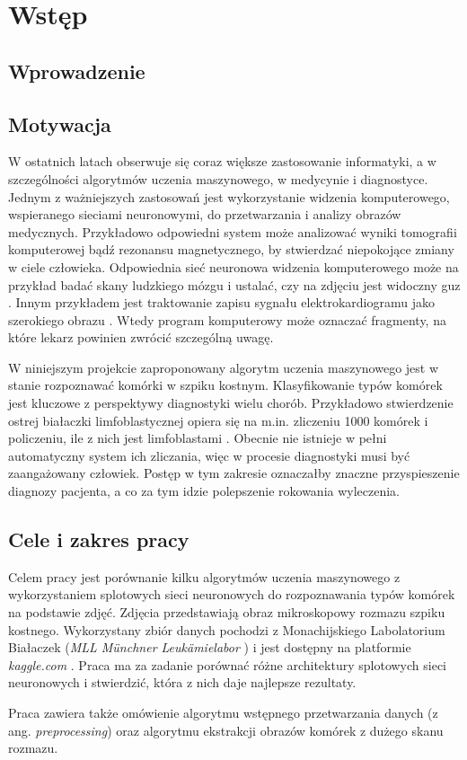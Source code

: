 \chapter{Wstęp}

\section{Wprowadzenie}


\section{Motywacja}

W ostatnich latach obserwuje się coraz większe zastosowanie informatyki, a w szczególności algorytmów uczenia maszynowego,
w medycynie i diagnostyce.
Jednym z ważniejszych zastosowań jest wykorzystanie widzenia komputerowego, wspieranego sieciami neuronowymi, do przetwarzania i analizy obrazów medycznych.
Przykładowo odpowiedni system może analizować wyniki tomografii komputerowej bądź rezonansu magnetycznego, by stwierdzać niepokojące zmiany w ciele człowieka.
Odpowiednia sieć neuronowa widzenia komputerowego może na przykład badać skany ludzkiego mózgu i ustalać, czy na zdjęciu jest widoczny guz \cite{brain_tumor}.
Innym przykładem jest traktowanie zapisu sygnału elektrokardiogramu jako szerokiego
obrazu \cite{ecg_cnn}.
Wtedy program komputerowy może oznaczać fragmenty, na które lekarz powinien zwrócić szczególną uwagę.

W niniejszym projekcie zaproponowany algorytm uczenia maszynowego jest w stanie rozpoznawać komórki w szpiku kostnym.
Klasyfikowanie typów komórek jest kluczowe z perspektywy diagnostyki wielu chorób.
Przykładowo stwierdzenie ostrej białaczki limfoblastycznej opiera się na m.in.
zliczeniu 1000 komórek i policzeniu, ile z nich jest limfoblastami \cite{blast_counting_diagnosis}.
Obecnie nie istnieje w pełni automatyczny system ich zliczania, więc w procesie diagnostyki musi być zaangażowany człowiek.
Postęp w tym zakresie oznaczałby znaczne przyspieszenie diagnozy pacjenta, a co za tym idzie polepszenie rokowania wyleczenia.

\section{Cele i zakres pracy}

Celem pracy jest porównanie kilku algorytmów uczenia maszynowego z wykorzystaniem splotowych sieci neuronowych do rozpoznawania typów komórek na podstawie zdjęć.
Zdjęcia przedstawiają obraz mikroskopowy rozmazu szpiku kostnego. Wykorzystany zbiór danych pochodzi z
Monachijskiego Labolatorium Białaczek (\textit{MLL Münchner Leukämielabor} \cite{mll}) i jest dostępny na platformie \textit{kaggle.com} \cite{dataset}.
Praca ma za zadanie porównać różne architektury splotowych sieci neuronowych i stwierdzić, która z nich daje najlepsze rezultaty.

Praca zawiera także omówienie algorytmu wstępnego przetwarzania danych (z ang. \textit{preprocessing}) oraz algorytmu ekstrakcji obrazów komórek z dużego skanu rozmazu.
